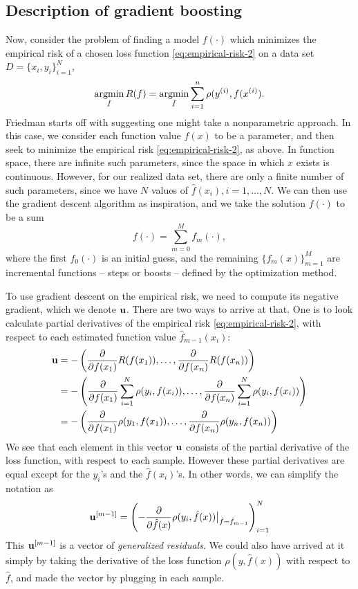 \subsection{Description of gradient boosting}
Now, consider the problem of finding a model $f(\cdot)$ which minimizes the empirical risk of a chosen loss function \eqref{eq:empirical-risk-2} on a data set $D=\{x_i,y_i\}_{i=1}^N$,
\begin{equation}
    \operatorname*{argmin}_{f}R(f)=\operatorname*{argmin}_{f}\sum_{i=1}^n\rho(y^{(i)},f(x^{(i)}).
\end{equation}
Friedman starts off with suggesting one might take a nonparametric approach. In this case, we consider each function value $f(x)$ to be a parameter, and then seek to minimize the empirical risk \eqref{eq:empirical-risk-2}, as above. In function space, there are infinite such parameters, since the space in which $x$ exists is continuous. However, for our realized data set, there are only a finite number of such parameters, since we have $N$ values of $\hat{f}(x_i),i=1,\ldots,N$. We can then use the gradient descent algorithm as inspiration, and we take the solution $f(\cdot)$ to be a sum
\begin{equation}
    f(\cdot)=\sum_{m=0}^M f_m(\cdot),
\end{equation}
where the first $f_0(\cdot)$ is an initial guess, and the remaining $\{f_m(x)\}_{m=1}^M$ are incremental functions -- steps or boosts -- defined by the optimization method.

To use gradient descent on the empirical risk, we need to compute its negative gradient, which we denote $\mathbf{u}$. There are two ways to arrive at that. One is to look calculate partial derivatives of the empirical risk \eqref{eq:empirical-risk-2}, with respect to each estimated function value $\hat{f}_{m-1}(x_i)$:
\begin{align}
    \mathbf{u}&=-\left(\frac{\partial}{\partial f(x_1)}R(f(x_1)),\ldots,\frac{\partial}{\partial f(x_n)}R(f(x_n))\right) \\
    &=-\left(\frac{\partial}{\partial f(x_1)}\sum_{i=1}^N\rho(y_i, f(x_i)),\ldots,\frac{\partial}{\partial f(x_n)}\sum_{i=1}^N\rho(y_i, f(x_i))\right) \\
    &=-\left(\frac{\partial}{\partial f(x_1)}\rho(y_1, f(x_1)),\ldots,\frac{\partial}{\partial f(x_n)}\rho(y_n, f(x_n))\right)
\end{align}
We see that each element in this vector $\mathbf{u}$ consists of the partial derivative of the loss function, with respect to each sample. However these partial derivatives are equal except for the $y_i$'s and the $\hat{f}(x_i)$'s. In other words, we can simplify the notation as
\begin{equation}
    \mathbf{u}^{[m-1]}=\left(-\frac{\partial}{\partial \hat{f}(x)}\rho(y_i, \hat{f}(x))\big\rvert_{\hat{f}=\hat{f}_{m-1}}\right)_{i=1}^N
\end{equation}
This $\mathbf{u}^{[m-1]}$ is a vector of \textit{generalized residuals}. We could also have arrived at it simply by taking the derivative of the loss function $\rho(y,\hat{f}(x))$ with respect to $\hat{f}$, and made the vector by plugging in each sample.

